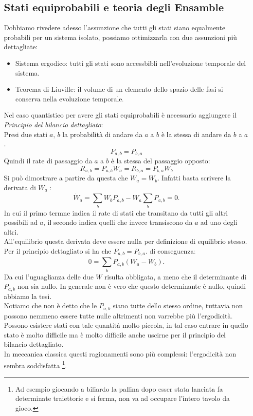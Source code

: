 \subsection{Stati equiprobabili e teoria degli Ensamble}%
Dobbiamo rivedere adesso l'assunzione che tutti gli stati siano equalmente probabili per un sistema isolato, possiamo ottimizzarla con due assunzioni più dettagliate:
\begin{itemize}
	\item Sistema ergodico: tutti gli stati sono accessbibli nell'evoluzione temporale del sistema.
	\item Teorema di Liuville: il volume di un elemento dello spazio delle fasi si conserva nella evoluzione temporale.
\end{itemize}
Nel caso quantistico per avere gli stati equiprobabili è necessario aggiungere il \textit{Principio del bilancio dettagliato}:\\
Presi due stati $a$, $b$ la probabilità di andare da $a$ a $b$ è la stessa di andare da $b$ a $a$.
\[
	P_{a,b} = P_{b,a}
\]
Quindi il rate di passaggio da $a$ a $b$ è la stessa del passaggio opposto: 
\[
R_{a,b} = P_{a,b} W_{a} = R_{b,a}= P_{b,a} W_{b}
\]
Si può dimostrare a partire da questa che $W_{a}=W_{b}$. Infatti basta scrivere la derivata di $W_{a}$ :
\[
	\dot{W}_{a} = \sum_{b}^{} W_{b}P_{a,b} - W_{a}\sum_{b}^{} P_{a,b} = 0
.\] 
In cui il primo termne indica il rate di stati che transitano da tutti gli altri possibili ad $a$, il secondo indica quelli che invece transiscono da $a$ ad uno degli altri.\\
All'equilibrio questa derivata deve essere nulla per definizione di equilibrio stesso. Per il principio dettagliato si ha che $P_{a, b} = P_{b,a}$. di conseguenza:
\[
	0 = \sum_{b}^{} P_{a,b} ( W_{a}-W_{b}) 
.\] 
Da cui l'uguaglianza delle due $W$ risulta obbligata, a meno che il determinante di $P_{a, b}$ non sia nullo. In generale non è vero che questo determinante è nullo, quindi abbiamo la tesi.\\
Notiamo che non è detto che le $P_{a,b}$ siano tutte dello stesso ordine, tuttavia non possono nemmeno essere tutte nulle altrimenti non varrebbe più l'ergodicità. Possono esistere stati con tale quantità molto piccola, in tal caso entrare in quello stato è molto difficile ma è molto difficile anche uscirne per il principio del bilancio dettagliato.\\
In meccanica classica questi ragionamenti sono più complessi: l'ergodicità non sembra soddisfatta \footnote{Ad esempio giocando a biliardo la pallina dopo esser stata lanciata fa determinate traiettorie e si ferma, non va ad occupare l'intero tavolo da gioco.}.
